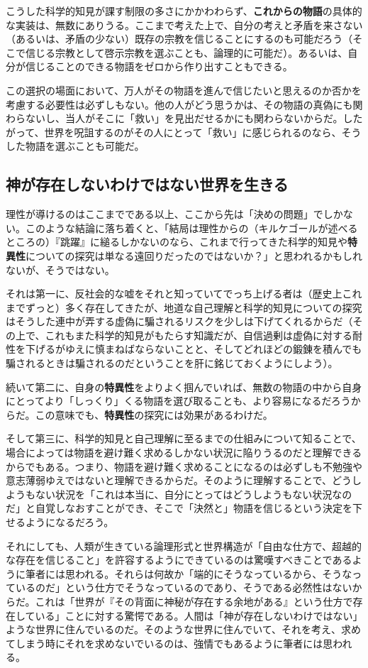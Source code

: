 こうした科学的知見が課す制限の多さにかかわわらず、\textbf{これからの物語}の具体的な実装は、無数にありうる。ここまで考えた上で、自分の考えと矛盾を来さない（あるいは、矛盾の少ない）既存の宗教を信じることにするのも可能だろう（そこで信じる宗教として啓示宗教を選ぶことも、論理的に可能だ）。あるいは、自分が信じることのできる物語をゼロから作り出すこともできる。

この選択の場面において、万人がその物語を進んで信じたいと思えるのか否かを考慮する必要性は必ずしもない。他の人がどう思うかは、その物語の真偽にも関わらないし、当人がそこに「救い」を見出だせるかにも関わらないからだ。したがって、世界を呪詛するのがその人にとって「救い」に感じられるのなら、そうした物語を選ぶことも可能だ。

\subsection{神が存在しないわけではない世界を生きる}\label{ux795eux304cux5b58ux5728ux3057ux306aux3044ux308fux3051ux3067ux306fux306aux3044ux4e16ux754cux3092ux751fux304dux308b}

理性が導けるのはここまでである以上、ここから先は「決めの問題」でしかない。このような結論に落ち着くと、「結局は理性からの（キルケゴールが述べるところの）『跳躍』に縋るしかないのなら、これまで行ってきた科学的知見や\textbf{特異性}についての探究は単なる遠回りだったのではないか？」と思われるかもしれないが、そうではない。

それは第一に、反社会的な嘘をそれと知っていてでっち上げる者は（歴史上これまでずっと）多く存在してきたが、地道な自己理解と科学的知見についての探究はそうした連中が弄する虚偽に騙されるリスクを少しは下げてくれるからだ（その上で、これもまた科学的知見がもたらす知識だが、自信過剰は虚偽に対する耐性を下げるがゆえに慎まねばならないことと、そしてどれほどの鍛錬を積んでも騙されるときは騙されるのだということを肝に銘じておくようにしよう）。

続いて第二に、自身の\textbf{特異性}をよりよく掴んでいれば、無数の物語の中から自身にとってより「しっくり」くる物語を選び取ることも、より容易になるだろうからだ。この意味でも、\textbf{特異性}の探究には効果があるわけだ。

そして第三に、科学的知見と自己理解に至るまでの仕組みについて知ることで、場合によっては物語を避け難く求めるしかない状況に陥りうるのだと理解できるからでもある。つまり、物語を避け難く求めることになるのは必ずしも不勉強や意志薄弱ゆえではないと理解できるからだ。そのように理解することで、どうしようもない状況を「これは本当に、自分にとってはどうしようもない状況なのだ」と自覚しなおすことができ、そこで「決然と」物語を信じるという決定を下せるようになるだろう。

それにしても、人類が生きている論理形式と世界構造が「自由な仕方で、超越的な存在を信じること」を許容するようにできているのは驚嘆すべきことであるように筆者には思われる。それらは何故か「端的にそうなっているから、そうなっているのだ」という仕方でそうなっているのであり、そうである必然性はないからだ。これは「世界が『その背面に神秘が存在する余地がある』という仕方で存在している」ことに対する驚愕である。人間は「神が存在しないわけではない」ような世界に住んでいるのだ。そのような世界に住んでいて、それを考え、求めてしまう時にそれを求めないでいるのは、強情でもあるように筆者には思われる。
